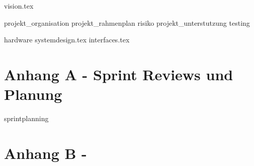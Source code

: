 \documentclass[a4paper, 10pt, fleqn]{article}
\begin{document}
	\begin{titlepage}
		\titleGM
		\thispagestyle{empty}
	\end{titlepage}
	
    
	\tableofcontents
	
    \clearpage
    
	\clearpage
	
    
    {vision.tex}
    
    {projekt_organisation}
    \clearpage
    {projekt_rahmenplan}
    \clearpage
    \clearpage
    {risiko}
    \clearpage
    {projekt_unterstutzung}
    \clearpage
    {testing}
    
    {hardware}
    \clearpage
	{systemdesign.tex}
    \clearpage
    {interfaces.tex}
    
    \clearpage
    
    
    \clearpage
    \nocite{*}
    
    
    
    \clearpage
    \listoffigures
    \listoftables
    
    \clearpage
   	\section*{Anhang A - Sprint Reviews und Planung}
    {sprintplanning}
    
    \clearpage
    \section*{Anhang B -}
\end{document}
